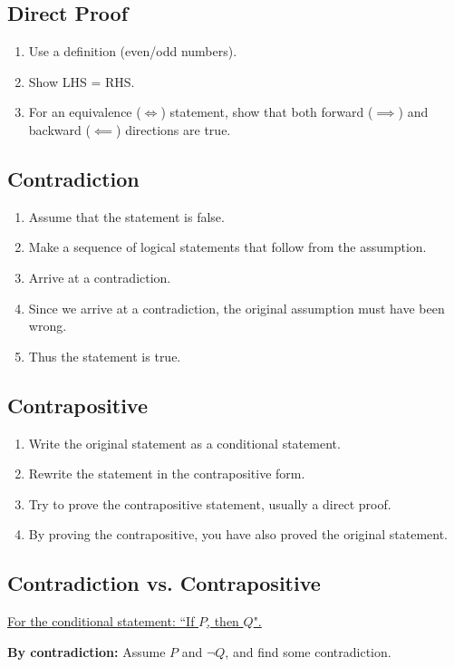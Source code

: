 \documentclass{article}
\theoremstyle{plain}
\numberwithin{theorem}{section}
\theoremstyle{definition}
\numberwithin{definition}{section}
\theoremstyle{remark}
\numberwithin{note}{section}
\begin{document}
\subsection{Direct Proof}
\begin{enumerate}
    \item Use a definition (even/odd numbers).
    \item Show LHS = RHS.
    \item For an equivalence ($\iff$) statement, show that both forward ($\implies$) and backward ($\impliedby$) directions are true.
\end{enumerate}
%
\subsection{Contradiction}
\begin{enumerate}
    \item Assume that the statement is false.
    \item Make a sequence of logical statements that follow from the assumption.
    \item Arrive at a contradiction.
    \item Since we arrive at a contradiction, the original assumption must have been wrong.
    \item Thus the statement is true.
\end{enumerate}
%
\subsection{Contrapositive}
\begin{enumerate}
    \item Write the original statement as a conditional statement.
    \item Rewrite the statement in the contrapositive form.
    \item Try to prove the contrapositive statement, usually a direct proof.
    \item By proving the contrapositive, you have also proved the original statement.
\end{enumerate}
%
\subsection{Contradiction vs. Contrapositive}
\underline{For the conditional statement: ``If $P$, then $Q$".}

\noindent\textbf{By contradiction:} Assume $P$ and $\neg{Q}$, and find some contradiction.
\end{document}
